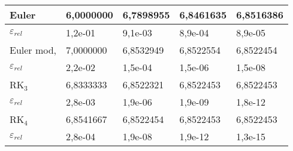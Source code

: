 \begin{resp} 
\begin{center}
 \begin{tabular}{|l|l|l|l|l|}%
\hline
Euler & 6,0000000 & 6,7898955 & 6,8461635 & 6,8516386\\
\hline
$\varepsilon_{rel}$ & 1,2e-01 & 9,1e-03 & 8,9e-04 & 8,9e-05\\
\hline
Euler mod, & 7,0000000 & 6,8532949 & 6,8522554 & 6,8522454\\
\hline
$\varepsilon_{rel}$ & 2,2e-02 & 1,5e-04 & 1,5e-06 & 1,5e-08\\
\hline
RK$_3$ & 6,8333333 & 6,8522321 & 6,8522453 & 6,8522453\\
\hline
$\varepsilon_{rel}$ & 2,8e-03 & 1,9e-06 & 1,9e-09 & 1,8e-12\\
\hline
RK$_4$ & 6,8541667 & 6,8522454 & 6,8522453 & 6,8522453\\
\hline
$\varepsilon_{rel}$ & 2,8e-04 & 1,9e-08 & 1,9e-12 & 1,3e-15\\
\hline
\end{tabular}
\end{center}

\end{resp}



